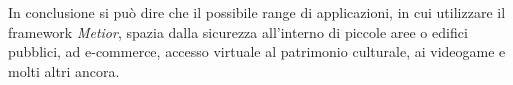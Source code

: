 In conclusione si può dire che il possibile range di applicazioni, in cui utilizzare il framework \emph{Metior},
spazia dalla sicurezza all'interno di piccole aree o edifici pubblici, ad e-commerce, accesso virtuale al patrimonio culturale,
 ai videogame e molti altri ancora.

